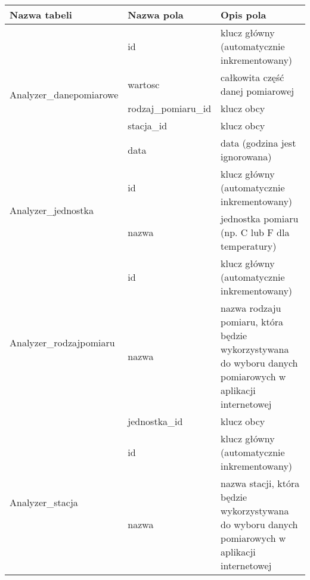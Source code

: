 \begin{longtable}{|p{0.25\linewidth}|p{0.25\linewidth}||p{0.5\linewidth}|}
\hline
\textbf{Nazwa tabeli} & \textbf{Nazwa pola} & \textbf{Opis pola} \tabularnewline \hline \hline
\multirow{5}{*}{Analyzer\_danepomiarowe} & id & klucz główny (automatycznie inkrementowany) \tabularnewline\cline{2-3}
 & wartosc & całkowita część danej pomiarowej \tabularnewline\cline{2-3}
 & rodzaj\_pomiaru\_id & klucz obcy \tabularnewline\cline{2-3}
 & stacja\_id & klucz obcy \tabularnewline\cline{2-3}
 & data & data (godzina jest ignorowana) \tabularnewline\hline
\multirow{2}{*}{Analyzer\_jednostka} 
 & id & klucz główny (automatycznie inkrementowany) \tabularnewline\cline{2-3}
 & nazwa & jednostka pomiaru (np. C lub F dla temperatury) \tabularnewline\hline
\multirow{3}{*}{Analyzer\_rodzajpomiaru}
 & id & klucz główny (automatycznie inkrementowany) \tabularnewline\cline{2-3}
 & nazwa & nazwa rodzaju pomiaru, która będzie wykorzystywana do wyboru danych pomiarowych w aplikacji internetowej \tabularnewline\cline{2-3}
 & jednostka\_id & klucz obcy \tabularnewline\hline
\multirow{2}{*}{Analyzer\_stacja}
 & id & klucz główny (automatycznie inkrementowany) \tabularnewline\cline{2-3}
 & nazwa & nazwa stacji, która będzie wykorzystywana do wyboru danych pomiarowych w aplikacji internetowej \tabularnewline\hline
\end{longtable}

